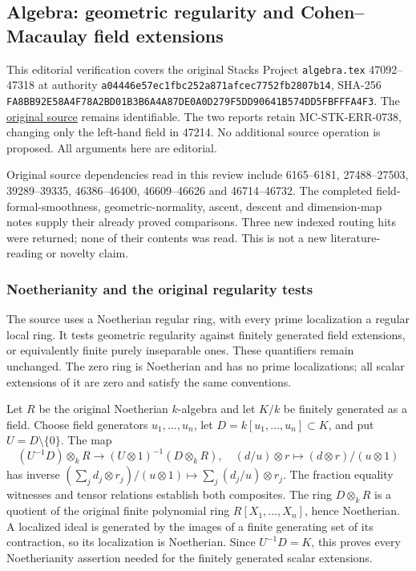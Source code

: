 \subsection{Algebra: geometric regularity and Cohen--Macaulay field extensions}\label{algebra-geometric-regularity-and-cohenmacaulay-field-extensions}

This editorial verification covers the original Stacks Project \texttt{algebra.tex} 47092--47318 at authority \texttt{a04446e57ec1fbc252a871afcec7752fb2807b14}, SHA-256 \texttt{FA8BB92E58A4F78A2BD01B3B6A4A87DE0A0D279F5DD90641B574DD5FBFFFA4F3}. The \href{https://github.com/stacks/stacks-project/blob/a04446e57ec1fbc252a871afcec7752fb2807b14/algebra.tex\#L47092}{original source} remains identifiable. The two reports retain MC-STK-ERR-0738, changing only the left-hand field in 47214. No additional source operation is proposed. All arguments here are editorial.

Original source dependencies read in this review include 6165--6181, 27488--27503, 39289--39335, 46386--46400, 46609--46626 and 46714--46732. The completed field-formal-smoothness, geometric-normality, ascent, descent and dimension-map notes supply their already proved comparisons. Three new indexed routing hits were returned; none of their contents was read. This is not a new literature-reading or novelty claim.

\subsubsection{Noetherianity and the original regularity tests}\label{noetherianity-and-the-original-regularity-tests}

The source uses a Noetherian regular ring, with every prime localization a regular local ring. It tests geometric regularity against finitely generated field extensions, or equivalently finite purely inseparable ones. These quantifiers remain unchanged. The zero ring is Noetherian and has no prime localizations; all scalar extensions of it are zero and satisfy the same conventions.

Let \(R\) be the original Noetherian \(k\)-algebra and let \(K/k\) be finitely generated as a field. Choose field generators \(u_1,\ldots,u_n\), let \(D=k[u_1,\ldots,u_n]\subset K\), and put \(U=D\setminus\{0\}\). The map \[
 (U^{-1}D)\otimes_kR\longrightarrow(U\otimes1)^{-1}(D\otimes_kR),
 \quad(d/u)\otimes r\longmapsto(d\otimes r)/(u\otimes1)
\] has inverse \((\sum_jd_j\otimes r_j)/(u\otimes1)\mapsto\sum_j(d_j/u)\otimes r_j\). The fraction equality witnesses and tensor relations establish both composites. The ring \(D\otimes_kR\) is a quotient of the original finite polynomial ring \(R[X_1,\ldots,X_n]\), hence Noetherian. A localized ideal is generated by the images of a finite generating set of its contraction, so its localization is Noetherian. Since \(U^{-1}D=K\), this proves every Noetherianity assertion needed for the finitely generated scalar extensions.

